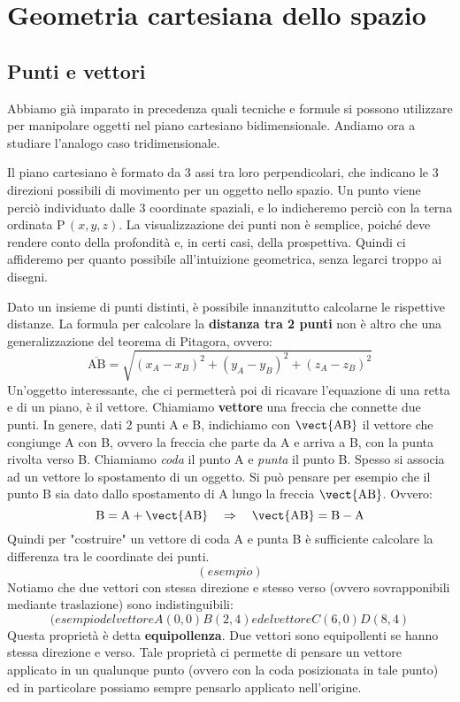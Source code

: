 \chapter{Geometria cartesiana dello spazio}

\section{Punti e vettori}
\label{sec:Punti_e_vettori}

Abbiamo già imparato in precedenza quali tecniche e formule si possono utilizzare per manipolare oggetti nel piano cartesiano bidimensionale. Andiamo ora a studiare l'analogo caso tridimensionale. 

\vspace{7pt}

Il piano cartesiano è formato da 3 assi tra loro perpendicolari, che indicano le 3 direzioni possibili di movimento per un oggetto nello spazio. Un punto viene perciò individuato dalle 3 coordinate spaziali, e lo indicheremo perciò con la terna ordinata P\,$(x,y,z)$. La visualizzazione dei punti non è semplice, poiché deve rendere conto della profondità e, in certi casi, della prospettiva. Quindi ci affideremo per quanto possibile all'intuizione geometrica, senza legarci troppo ai disegni.

\vspace{7pt}

Dato un insieme di punti distinti, è possibile innanzitutto calcolarne le rispettive distanze. La formula per calcolare la \textbf{distanza tra 2 punti} non è altro che una generalizzazione del teorema di Pitagora, ovvero:
\[\overline{\text{AB}} = \sqrt{(x_A-x_B)^2+(y_A-y_B)^2+(z_A-z_B)^2}\]
Un'oggetto interessante, che ci permetterà poi di ricavare l'equazione di una retta e di un piano, è il vettore. Chiamiamo \textbf{vettore} una freccia che connette due punti. In genere, dati 2 punti A e B, indichiamo con $\vect{\text{AB}}$ il vettore che congiunge A con B, ovvero la freccia che parte da A e arriva a B, con la punta rivolta verso B. Chiamiamo \emph{coda} il punto A e \emph{punta} il punto B. Spesso si associa ad un vettore lo spostamento di un oggetto. Si può pensare per esempio che il punto B sia dato dallo spostamento di A lungo la freccia $\vect{\text{AB}}$. Ovvero:
\[\text{B} = \text{A}+\vect{\text{AB}} \quad \Rightarrow \quad \vect{\text{AB}} = \text{B}-\text{A}\]
Quindi per "costruire" un vettore di coda A e punta B è sufficiente calcolare la differenza tra le coordinate dei punti.
\[(esempio)\]
Notiamo che due vettori con stessa direzione e stesso verso (ovvero sovrapponibili mediante traslazione) sono indistinguibili:
\[(esempio del vettore A(0,0) B(2,4) e del vettore C(6,0) D(8,4)\]
Questa proprietà è detta \textbf{equipollenza}. Due vettori sono equipollenti se hanno stessa direzione e verso. Tale proprietà ci permette di pensare un vettore applicato in un qualunque punto (ovvero con la coda posizionata in tale punto) ed in particolare possiamo sempre pensarlo applicato nell'origine.

